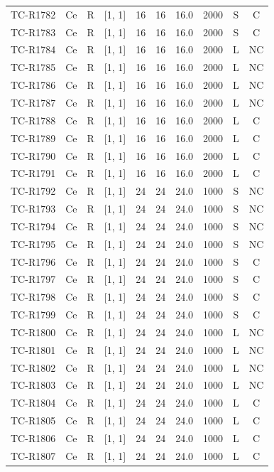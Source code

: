 \begin{longtable}{lccccccccc}
TC-R1782 & Ce & R & [1, 1] & 16 & 16 & 16.0 & 2000 & S & C \\
TC-R1783 & Ce & R & [1, 1] & 16 & 16 & 16.0 & 2000 & S & C \\
TC-R1784 & Ce & R & [1, 1] & 16 & 16 & 16.0 & 2000 & L & NC \\
TC-R1785 & Ce & R & [1, 1] & 16 & 16 & 16.0 & 2000 & L & NC \\
TC-R1786 & Ce & R & [1, 1] & 16 & 16 & 16.0 & 2000 & L & NC \\
TC-R1787 & Ce & R & [1, 1] & 16 & 16 & 16.0 & 2000 & L & NC \\
TC-R1788 & Ce & R & [1, 1] & 16 & 16 & 16.0 & 2000 & L & C \\
TC-R1789 & Ce & R & [1, 1] & 16 & 16 & 16.0 & 2000 & L & C \\
TC-R1790 & Ce & R & [1, 1] & 16 & 16 & 16.0 & 2000 & L & C \\
TC-R1791 & Ce & R & [1, 1] & 16 & 16 & 16.0 & 2000 & L & C \\
TC-R1792 & Ce & R & [1, 1] & 24 & 24 & 24.0 & 1000 & S & NC \\
TC-R1793 & Ce & R & [1, 1] & 24 & 24 & 24.0 & 1000 & S & NC \\
TC-R1794 & Ce & R & [1, 1] & 24 & 24 & 24.0 & 1000 & S & NC \\
TC-R1795 & Ce & R & [1, 1] & 24 & 24 & 24.0 & 1000 & S & NC \\
TC-R1796 & Ce & R & [1, 1] & 24 & 24 & 24.0 & 1000 & S & C \\
TC-R1797 & Ce & R & [1, 1] & 24 & 24 & 24.0 & 1000 & S & C \\
TC-R1798 & Ce & R & [1, 1] & 24 & 24 & 24.0 & 1000 & S & C \\
TC-R1799 & Ce & R & [1, 1] & 24 & 24 & 24.0 & 1000 & S & C \\
TC-R1800 & Ce & R & [1, 1] & 24 & 24 & 24.0 & 1000 & L & NC \\
TC-R1801 & Ce & R & [1, 1] & 24 & 24 & 24.0 & 1000 & L & NC \\
TC-R1802 & Ce & R & [1, 1] & 24 & 24 & 24.0 & 1000 & L & NC \\
TC-R1803 & Ce & R & [1, 1] & 24 & 24 & 24.0 & 1000 & L & NC \\
TC-R1804 & Ce & R & [1, 1] & 24 & 24 & 24.0 & 1000 & L & C \\
TC-R1805 & Ce & R & [1, 1] & 24 & 24 & 24.0 & 1000 & L & C \\
TC-R1806 & Ce & R & [1, 1] & 24 & 24 & 24.0 & 1000 & L & C \\
TC-R1807 & Ce & R & [1, 1] & 24 & 24 & 24.0 & 1000 & L & C \\

\end{longtable}
